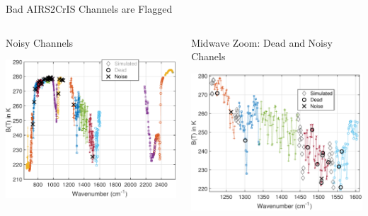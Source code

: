 \documentclass[10pt,t]{beamer}
\begin{document}
\begin{frame}[label={sec:org2c660e7}]{Bad AIRS2CrIS Channels are Flagged}
\vspace{-0.25in}

\begin{columns}
\begin{column}{0.55\columnwidth}
\begin{block}{\footnotesize Noisy Channels}
\vspace{-0.05in}
\vspace{-0.05in}
\begin{center}
\includegraphics[width=0.77\linewidth]{./Figs/Pdf/a2c_full_show_noise.pdf}
\end{center}
\end{block}
\end{column}

\begin{column}{0.55\columnwidth}
\begin{block}{\footnotesize Midwave Zoom: Dead and Noisy Chanels}
\vspace{-0.05in}
\vspace{-0.05in}
\begin{center}
\includegraphics[width=0.77\linewidth]{./Figs/Pdf/a2c_full_show_dead_noise_water.pdf}
\end{center}
\end{block}
\end{column}
\end{columns}
\end{frame}
\end{document}
